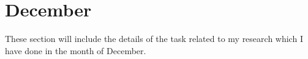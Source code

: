 \chapter{December}
\label{chap:Dec}

These section will include the details of the task related to my research which I have done in the month of December.





